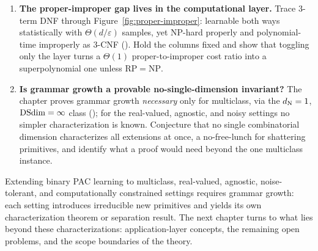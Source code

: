 \begin{enumerate}[leftmargin=*,itemsep=3pt]
\item \textbf{The proper-improper gap lives in the computational layer.} Trace
$3$-term DNF through Figure~\ref{fig:proper-improper}: learnable both ways
statistically with $\Theta(d/\varepsilon)$ samples, yet NP-hard properly and
polynomial-time improperly as $3$-CNF ().  Hold the columns
fixed and show that toggling only the layer turns a $\Theta(1)$ proper-to-improper
cost ratio into a superpolynomial one unless $\mathrm{RP} = \mathrm{NP}$.

\item \textbf{Is grammar growth a provable no-single-dimension invariant?} The
chapter proves grammar growth \emph{necessary} only for multiclass, via the
$d_{\mathrm{N}} = 1$, $\mathrm{DSdim} = \infty$ class (); for the real-valued,
agnostic, and noisy settings no simpler characterization is known.  Conjecture that
no single combinatorial dimension characterizes all extensions at once, a
no-free-lunch for shattering primitives, and identify what a proof would need
beyond the one multiclass instance.
\end{enumerate}

\bigskip

Extending binary PAC learning to multiclass, real-valued, agnostic,
noise-tolerant, and computationally constrained settings requires grammar
growth: each setting introduces irreducible new primitives and yields its own
characterization theorem or separation result.  The next chapter turns to
what lies beyond these characterizations: application-layer concepts, the
remaining open problems, and the scope boundaries of the theory.
